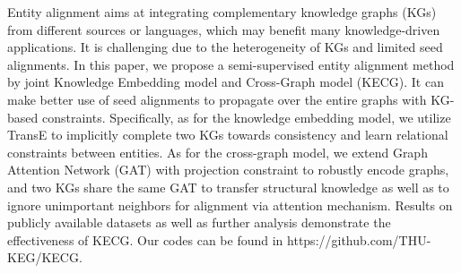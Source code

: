 Entity alignment aims at integrating complementary knowledge graphs (KGs) from different sources or languages, which may benefit many knowledge-driven applications. It is challenging due to the heterogeneity of KGs and limited seed alignments. In this paper, we propose a semi-supervised entity alignment method by joint Knowledge Embedding model and Cross-Graph model (KECG). It can make better use of seed alignments to propagate over the entire graphs with KG-based constraints. Specifically, as for the knowledge embedding model, we utilize TransE to implicitly complete two KGs towards consistency and learn relational constraints between entities. As for the cross-graph model, we extend Graph Attention Network (GAT) with projection constraint to robustly encode graphs, and two KGs share the same GAT to transfer structural knowledge as well as to ignore unimportant neighbors for alignment via attention mechanism. Results on publicly available datasets as well as further analysis demonstrate the effectiveness of KECG. Our codes can be found in https://github.com/THU-KEG/KECG.
